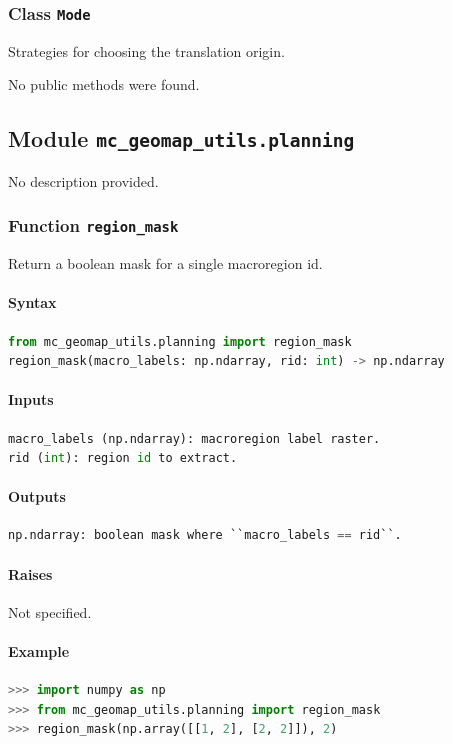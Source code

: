 \documentclass[11pt]{article}
\begin{document}
\subsubsection{Class \texttt{Mode}}
Strategies for choosing the translation origin.

No public methods were found.

\subsection{Module \texttt{mc\_geomap\_utils.planning}}
No description provided.

\subsubsection{Function \texttt{region\_mask}}
Return a boolean mask for a single macroregion id.

\paragraph{Syntax}
\begin{lstlisting}[language=Python]
from mc_geomap_utils.planning import region_mask
region_mask(macro_labels: np.ndarray, rid: int) -> np.ndarray
\end{lstlisting}
\paragraph{Inputs}
\begin{lstlisting}[language=Python]
macro_labels (np.ndarray): macroregion label raster.
rid (int): region id to extract.
\end{lstlisting}
\paragraph{Outputs}
\begin{lstlisting}[language=Python]
np.ndarray: boolean mask where ``macro_labels == rid``.
\end{lstlisting}
\paragraph{Raises}
Not specified.
\paragraph{Example}
\begin{lstlisting}[language=Python]
>>> import numpy as np
>>> from mc_geomap_utils.planning import region_mask
>>> region_mask(np.array([[1, 2], [2, 2]]), 2)
\end{lstlisting}
\end{document}
